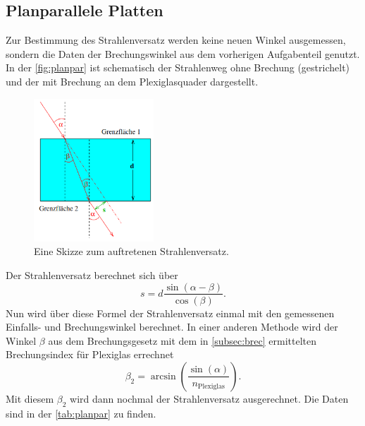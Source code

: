 \subsection{Planparallele Platten}

  Zur Bestimmung des Strahlenversatz werden keine neuen Winkel ausgemessen, sondern die Daten der Brechungswinkel aus dem vorherigen Aufgabenteil genutzt.
  In der \autoref{fig:planpar} ist schematisch der Strahlenweg ohne Brechung (gestrichelt) und der mit Brechung an dem Plexiglasquader dargestellt. 
  
  \begin{figure}
    \centering
    \includegraphics[width=0.4\textwidth]{bilder/planparallel.png}
    \caption{Eine Skizze zum auftretenen Strahlenversatz. \cite{anleitung}}
    \label{fig:planpar}
  \end{figure}

  \noindent Der Strahlenversatz berechnet sich über 
  \begin{equation*}
    s = d \frac{\sin(\alpha - \beta)}{\cos(\beta)}. 
  \end{equation*}
  Nun wird über diese Formel der Strahlenversatz einmal mit den gemessenen Einfalls- und Brechungswinkel berechnet. In einer anderen Methode wird der Winkel $\beta$ 
  aus dem Brechungsgesetz mit dem in \ref{subsec:brec} ermittelten Brechungsindex für Plexiglas errechnet 
  \begin{equation*}
    \beta_2 = \arcsin\left(\frac{\sin(\alpha)}{n_{\text{Plexiglas}}}\right). %
  \end{equation*}
  Mit diesem $\beta_2$ wird dann nochmal der Strahlenversatz ausgerechnet. Die Daten sind in der \autoref{tab:planpar} zu finden. 

